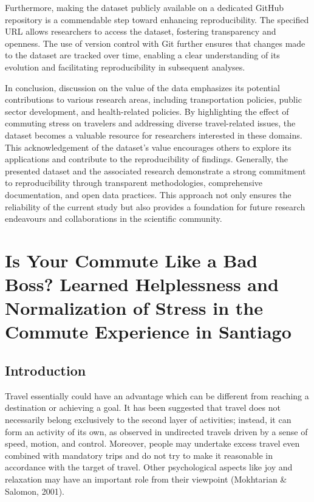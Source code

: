 \documentclass[
11pt, %
oneside, %
english, %
singlespacing, %
]{macthesis} %
\begin{document}
Furthermore, making the dataset publicly available on a dedicated GitHub repository is a commendable step toward enhancing reproducibility. The specified URL allows researchers to access the dataset, fostering transparency and openness. The use of version control with Git further ensures that changes made to the dataset are tracked over time, enabling a clear understanding of its evolution and facilitating reproducibility in subsequent analyses.

In conclusion, discussion on the value of the data emphasizes its potential contributions to various research areas, including transportation policies, public sector development, and health-related policies. By highlighting the effect of commuting stress on travelers and addressing diverse travel-related issues, the dataset becomes a valuable resource for researchers interested in these domains. This acknowledgement of the dataset's value encourages others to explore its applications and contribute to the reproducibility of findings. Generally, the presented dataset and the associated research demonstrate a strong commitment to reproducibility through transparent methodologies, comprehensive documentation, and open data practices. This approach not only ensures the reliability of the current study but also provides a foundation for future research endeavours and collaborations in the scientific community.

\hypertarget{is-your-commute-like-a-bad-boss-learned-helplessness-and-normalization-of-stress-in-the-commute-experience-in-santiago}{%
\chapter{Is Your Commute Like a Bad Boss? Learned Helplessness and Normalization of Stress in the Commute Experience in Santiago}\label{is-your-commute-like-a-bad-boss-learned-helplessness-and-normalization-of-stress-in-the-commute-experience-in-santiago}}

\hypertarget{introduction-3}{%
\section{Introduction}\label{introduction-3}}

Travel essentially could have an advantage which can be different from reaching a destination or achieving a goal. It has been suggested that travel does not necessarily belong exclusively to the second layer of activities; instead, it can form an activity of its own, as observed in undirected travels driven by a sense of speed, motion, and control. Moreover, people may undertake excess travel even combined with mandatory trips and do not try to make it reasonable in accordance with the target of travel. Other psychological aspects like joy and relaxation may have an important role from their viewpoint (Mokhtarian \& Salomon, 2001).
\end{document}
